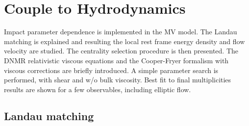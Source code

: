 \setchapterpreamble[u]{\margintoc}
\chapter{Couple to Hydrodynamics}

\begin{preview}[]
Impact parameter dependence is implemented in the {\sffamily MV} model. The Landau matching is explained and resulting the local rest frame energy density and flow velocity are studied. The centrality selection procedure is then presented. The {\sffamily DNMR} relativistic viscous equations and the Cooper-Fryer formalism with viscous corrections are briefly introduced. A simple parameter search is performed, with shear and w/o bulk viscosity. Best fit to final multiplicities results are shown for a few observables, including elliptic flow.
\end{preview}

\section{Landau matching}

